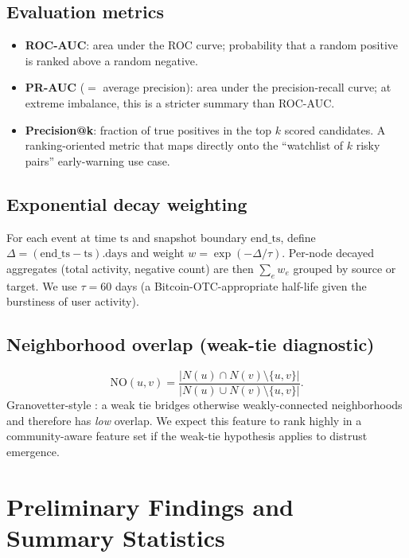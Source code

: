 \documentclass[11pt,a4paper]{article}
\begin{document}
\subsection{Evaluation metrics}
\begin{itemize}[nosep]
  \item \textbf{ROC-AUC}: area under the ROC curve; probability that a random
        positive is ranked above a random negative.
  \item \textbf{PR-AUC} ($=$ average precision): area under the
        precision-recall curve; at extreme imbalance, this is a stricter
        summary than ROC-AUC.
  \item \textbf{Precision@k}: fraction of true positives in the top $k$
        scored candidates. A ranking-oriented metric that maps directly onto
        the ``watchlist of $k$ risky pairs'' early-warning use case.
\end{itemize}

\subsection{Exponential decay weighting}
For each event at time $\mathrm{ts}$ and snapshot boundary
$\mathrm{end\_ts}$, define
$\Delta = (\mathrm{end\_ts} - \mathrm{ts}).\mathrm{days}$ and weight
$w = \exp(-\Delta / \tau)$. Per-node decayed aggregates (total activity,
negative count) are then $\sum_e w_e$ grouped by source or target. We use
$\tau = 60$ days (a Bitcoin-OTC-appropriate half-life given the burstiness of
user activity).

\subsection{Neighborhood overlap (weak-tie diagnostic)}
\begin{equation*}
\mathrm{NO}(u, v) = \frac{|N(u) \cap N(v) \setminus \{u, v\}|}
                         {|N(u) \cup N(v) \setminus \{u, v\}|}.
\end{equation*}
Granovetter-style \citep{granovetter1973}: a weak tie bridges otherwise
weakly-connected neighborhoods and therefore has \emph{low} overlap. We
expect this feature to rank highly in a community-aware feature set if the
weak-tie hypothesis applies to distrust emergence.

\section{Preliminary Findings and Summary Statistics}
\end{document}
